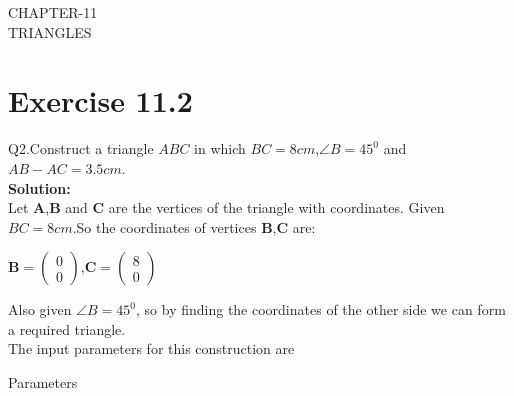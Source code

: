 \documentclass{article}
\newcommand{\myvec}[1]{\ensuremath{\begin{pmatrix}#1\end{pmatrix}}}
\let\vec\mathbf
\begin{document}
\begin{center}
        \textbf\large{CHAPTER-11 \\ TRIANGLES}
\end{center}
\section{Exercise 11.2}
Q2.Construct a triangle $ABC$ in which $BC=8cm$,$\angle{B}=45^0$ and $AB-AC=3.5cm$. \\
\textbf{Solution:}\\
Let $\vec{A}$,$\vec{B}$ and $\vec{C}$ are the vertices of the triangle with coordinates.
Given $BC=8cm$.So the coordinates of vertices $\vec{B}$,$\vec{C}$ are:
\begin{center}
{
$\vec{B} =\myvec{0\\0}$,$\vec{C} =\myvec{8\\0}$
}
\end{center}
Also given $\angle{B}=45^0$, so by finding the coordinates of the other side we can form a required triangle. \\
 The input parameters for this construction are
 \begin{table}[h]
	  \centering
	  
	  \caption{Parameters}
	  \label{tab:Table1}
\end{table}
\end{document}
